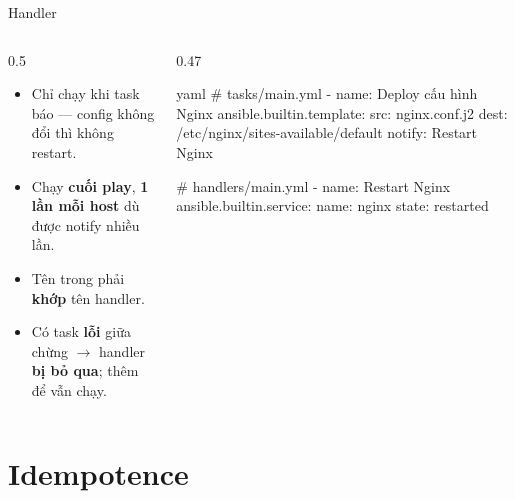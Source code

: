 \documentclass[aspectratio=169,11pt,xcolor=table]{beamer}
\begin{document}
\begin{frame}[fragile]{Handler}
  \begin{columns}[c]
    \begin{column}{0.5\textwidth}
      \begin{itemize}\small\setlength{\itemsep}{0.25cm}
        \item Chỉ chạy khi task  báo \textbf{} — config không đổi
              thì không restart.
        \item Chạy \textbf{cuối play}, \textbf{1 lần mỗi host} dù được notify nhiều lần.
        \item Tên trong  phải \textbf{khớp} tên handler.
        \item Có task \textbf{lỗi} giữa chừng $\rightarrow$ handler \textbf{bị bỏ qua};
              thêm  để vẫn chạy.
      \end{itemize}
    \end{column}
    \begin{column}{0.47\textwidth}
\begin{codeblock}[minted options={fontsize=\scriptsize}]{yaml}
# tasks/main.yml
- name: Deploy cấu hình Nginx
  ansible.builtin.template:
    src: nginx.conf.j2
    dest: /etc/nginx/sites-available/default
  notify: Restart Nginx

# handlers/main.yml
- name: Restart Nginx
  ansible.builtin.service:
    name: nginx
    state: restarted
\end{codeblock}
    \end{column}
  \end{columns}
\end{frame}

\section{Idempotence}
\end{document}
